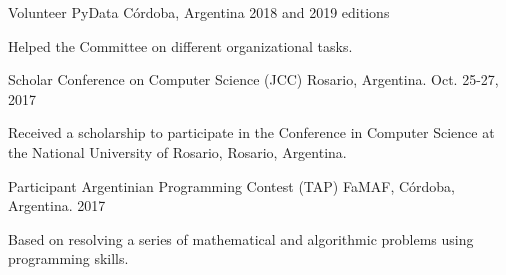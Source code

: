 \documentclass[10pt, a4paper]{resume}
\begin{document}

\begin{cventries}

  \cventry
    {Volunteer}
    {PyData}
    {Córdoba, Argentina}
    {2018 and 2019 editions}
    {
      \begin{cvitems}
		\item {Helped the Committee on different organizational tasks.}
      \end{cvitems}
    }

  \cventry
    {Scholar}
    {Conference on Computer Science (JCC)}
    {Rosario, Argentina.}
    {Oct. 25-27, 2017}
    {
      \begin{cvitems}
        \item {Received a scholarship to participate in the Conference in Computer Science at the National University of Rosario, Rosario, Argentina.}
      \end{cvitems}
    }

  \cventry
    {Participant}
    {Argentinian Programming Contest (TAP)}
    {FaMAF, Córdoba, Argentina.}
    {2017}
    {
      \begin{cvitems}
        \item {Based on resolving a series of mathematical and algorithmic problems using programming skills.}
      \end{cvitems}
    }

\end{cventries}


\end{document}

